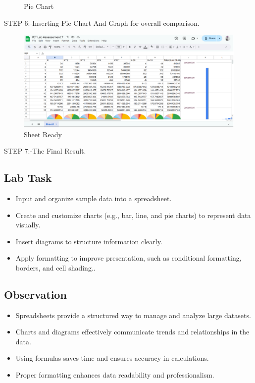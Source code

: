 \documentclass[a4paper,9pt]{article}
\begin{document}
\begin{enumerate}
\begin{figure}[H]
		\caption{Pie Chart}
	\end{figure}
	STEP 6:-Inserting Pie Chart And Graph for overall comparison.
	\begin{figure}[H]
		\centering
		\includegraphics[width=0.8\linewidth]{5.5.png}
		\caption{Sheet Ready}
	\end{figure}
	STEP 7:-The Final Result.
	
\end{enumerate}

\subsection{Lab Task}

\begin{itemize}
	\item Input and organize sample data into a spreadsheet.
	\item Create and customize charts (e.g., bar, line, and pie charts) to represent data visually.
	\item Insert diagrams to structure information clearly.
	\item Apply formatting to improve presentation, such as conditional formatting, borders, and cell shading..
\end{itemize}

\subsection{Observation}
\begin{itemize}
	\item Spreadsheets provide a structured way to manage and analyze large datasets.
	
	
	\item Charts and diagrams effectively communicate trends and relationships in the data.
	\item Using formulas saves time and ensures accuracy in calculations.
	\item Proper formatting enhances data readability and professionalism.
\end{itemize}
\end{document}
